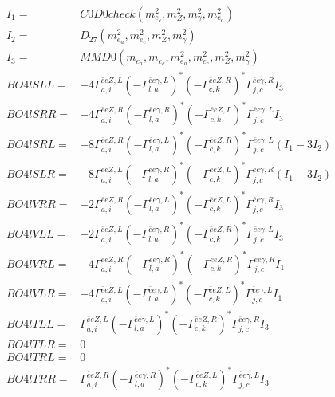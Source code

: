 \documentclass[A4,landscape]{article}
\begin{document}
\begin{align} 
I_1 = & C0D0check(m^2_{e_{{c}}}, m^2_{Z}, m^2_{\gamma}, m^2_{e_{{a}}}) \\ 
I_2 = & D_{27}(m^2_{e_{{a}}}, m^2_{e_{{c}}}, m^2_{Z}, m^2_{\gamma}) \\ 
I_3 = & MMD0(m_{e_{{a}}}, m_{e_{{c}}}, m^2_{e_{{a}}}, m^2_{e_{{c}}}, m^2_{Z}, m^2_{\gamma}) \\ 
  BO4lSLL= & -4  \Gamma^{\bar{e}e Z ,L}_{a, i} (- \Gamma^{\bar{e}e \gamma ,L} _{l, a})^* (- \Gamma^{\bar{e}e Z ,R} _{c, k})^* \Gamma^{\bar{e}e \gamma ,R}_{j, c} I_3 \\ 
  BO4lSRR= & -4  \Gamma^{\bar{e}e Z ,R}_{a, i} (- \Gamma^{\bar{e}e \gamma ,R} _{l, a})^* (- \Gamma^{\bar{e}e Z ,L} _{c, k})^* \Gamma^{\bar{e}e \gamma ,L}_{j, c} I_3 \\ 
  BO4lSRL= & -8  \Gamma^{\bar{e}e Z ,R}_{a, i} (- \Gamma^{\bar{e}e \gamma ,L} _{l, a})^* (- \Gamma^{\bar{e}e Z ,R} _{c, k})^* \Gamma^{\bar{e}e \gamma ,L}_{j, c} (I_1 - 3 I_2) \\ 
  BO4lSLR= & -8  \Gamma^{\bar{e}e Z ,L}_{a, i} (- \Gamma^{\bar{e}e \gamma ,R} _{l, a})^* (- \Gamma^{\bar{e}e Z ,L} _{c, k})^* \Gamma^{\bar{e}e \gamma ,R}_{j, c} (I_1 - 3 I_2) \\ 
  BO4lVRR= & -2  \Gamma^{\bar{e}e Z ,R}_{a, i} (- \Gamma^{\bar{e}e \gamma ,L} _{l, a})^* (- \Gamma^{\bar{e}e Z ,L} _{c, k})^* \Gamma^{\bar{e}e \gamma ,R}_{j, c} I_3 \\ 
  BO4lVLL= & -2  \Gamma^{\bar{e}e Z ,L}_{a, i} (- \Gamma^{\bar{e}e \gamma ,R} _{l, a})^* (- \Gamma^{\bar{e}e Z ,R} _{c, k})^* \Gamma^{\bar{e}e \gamma ,L}_{j, c} I_3 \\ 
  BO4lVRL= & -4  \Gamma^{\bar{e}e Z ,R}_{a, i} (- \Gamma^{\bar{e}e \gamma ,R} _{l, a})^* (- \Gamma^{\bar{e}e Z ,R} _{c, k})^* \Gamma^{\bar{e}e \gamma ,R}_{j, c} I_1 \\ 
  BO4lVLR= & -4  \Gamma^{\bar{e}e Z ,L}_{a, i} (- \Gamma^{\bar{e}e \gamma ,L} _{l, a})^* (- \Gamma^{\bar{e}e Z ,L} _{c, k})^* \Gamma^{\bar{e}e \gamma ,L}_{j, c} I_1 \\ 
  BO4lTLL= &  \Gamma^{\bar{e}e Z ,L}_{a, i} (- \Gamma^{\bar{e}e \gamma ,L} _{l, a})^* (- \Gamma^{\bar{e}e Z ,R} _{c, k})^* \Gamma^{\bar{e}e \gamma ,R}_{j, c} I_3 \\ 
  BO4lTLR= & 0 \\ 
  BO4lTRL= & 0 \\ 
  BO4lTRR= &  \Gamma^{\bar{e}e Z ,R}_{a, i} (- \Gamma^{\bar{e}e \gamma ,R} _{l, a})^* (- \Gamma^{\bar{e}e Z ,L} _{c, k})^* \Gamma^{\bar{e}e \gamma ,L}_{j, c} I_3 \\ 
\end{align} 
\end{document}
